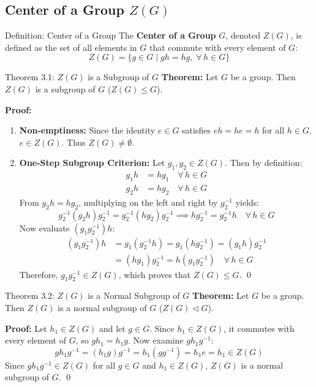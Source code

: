 \documentclass[11pt,a4paper]{article}
\begin{document}
\subsection{Center of a Group \texorpdfstring{$Z(G)$}{Z(G)}}

\begin{defbox}{Definition: Center of a Group}
The \textbf{Center of a Group} $G$, denoted $Z(G)$, is defined as the set of all elements in $G$ that commute with every element of $G$:
\begin{equation}
    Z(G) = \{ g \in G \mid gh = hg, \; \forall\, h \in G \}
\end{equation}
\end{defbox}

\begin{exbox}{Theorem 3.1: $Z(G)$ is a Subgroup of $G$}
\textbf{Theorem:} Let $G$ be a group. Then $Z(G)$ is a subgroup of $G$ ($Z(G) \le G$).

\textbf{Proof:}
\begin{enumerate}
    \item \textbf{Non-emptiness:} Since the identity $e \in G$ satisfies $eh = he = h$ for all $h \in G$, $e \in Z(G)$. Thus $Z(G) \neq \emptyset$.
    \item \textbf{One-Step Subgroup Criterion:} Let $g_1, g_2 \in Z(G)$. Then by definition:
    \begin{align}
        g_1 h &= h g_1 \quad \forall\, h \in G \\
        g_2 h &= h g_2 \quad \forall\, h \in G
    \end{align}
    From $g_2 h = h g_2$, multiplying on the left and right by $g_2^{-1}$ yields:
    \begin{equation}
        g_2^{-1}(g_2 h)g_2^{-1} = g_2^{-1}(h g_2)g_2^{-1} \implies h g_2^{-1} = g_2^{-1} h \quad \forall\, h \in G
    \end{equation}
    Now evaluate $(g_1 g_2^{-1}) h$:
    \begin{align}
        (g_1 g_2^{-1}) h &= g_1 (g_2^{-1} h) = g_1 (h g_2^{-1}) = (g_1 h) g_2^{-1} \nonumber \\
        &= (h g_1) g_2^{-1} = h (g_1 g_2^{-1}) \quad \forall\, h \in G
    \end{align}
    Therefore, $g_1 g_2^{-1} \in Z(G)$, which proves that $Z(G) \le G$. \qed
\end{enumerate}
\end{exbox}

\begin{exbox}{Theorem 3.2: $Z(G)$ is a Normal Subgroup of $G$}
\textbf{Theorem:} Let $G$ be a group. Then $Z(G)$ is a normal subgroup of $G$ ($Z(G) \triangleleft G$).

\textbf{Proof:}
Let $h_1 \in Z(G)$ and let $g \in G$. Since $h_1 \in Z(G)$, it commutes with every element of $G$, so $g h_1 = h_1 g$.
Now examine $g h_1 g^{-1}$:
\begin{equation}
    g h_1 g^{-1} = (h_1 g) g^{-1} = h_1 (g g^{-1}) = h_1 e = h_1 \in Z(G)
\end{equation}
Since $g h_1 g^{-1} \in Z(G)$ for all $g \in G$ and $h_1 \in Z(G)$, $Z(G)$ is a normal subgroup of $G$. \qed
\end{exbox}
\end{document}
